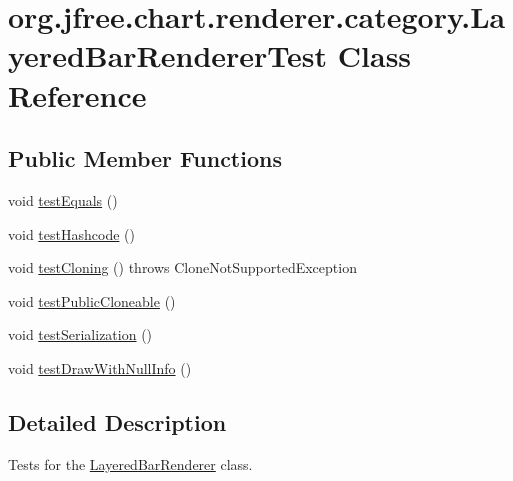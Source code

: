 \hypertarget{classorg_1_1jfree_1_1chart_1_1renderer_1_1category_1_1_layered_bar_renderer_test}{}\section{org.\+jfree.\+chart.\+renderer.\+category.\+Layered\+Bar\+Renderer\+Test Class Reference}
\label{classorg_1_1jfree_1_1chart_1_1renderer_1_1category_1_1_layered_bar_renderer_test}
\subsection*{Public Member Functions}
\begin{DoxyCompactItemize}
\item 
void \mbox{\hyperlink{classorg_1_1jfree_1_1chart_1_1renderer_1_1category_1_1_layered_bar_renderer_test_aeeece3b7e5a6a7843b88d3841bb58679}{test\+Equals}} ()
\item 
void \mbox{\hyperlink{classorg_1_1jfree_1_1chart_1_1renderer_1_1category_1_1_layered_bar_renderer_test_a5b1beeb9cdc090d8e244b494d24d7ad1}{test\+Hashcode}} ()
\item 
void \mbox{\hyperlink{classorg_1_1jfree_1_1chart_1_1renderer_1_1category_1_1_layered_bar_renderer_test_a2496a305e93aa650f5bb59eed054800f}{test\+Cloning}} ()  throws Clone\+Not\+Supported\+Exception 
\item 
void \mbox{\hyperlink{classorg_1_1jfree_1_1chart_1_1renderer_1_1category_1_1_layered_bar_renderer_test_a214b531ab471cc20aec9d909e69bb94a}{test\+Public\+Cloneable}} ()
\item 
void \mbox{\hyperlink{classorg_1_1jfree_1_1chart_1_1renderer_1_1category_1_1_layered_bar_renderer_test_a3d6234d17e75f36be8f12fbf4ea0ba52}{test\+Serialization}} ()
\item 
void \mbox{\hyperlink{classorg_1_1jfree_1_1chart_1_1renderer_1_1category_1_1_layered_bar_renderer_test_ac4f2caecbb4dec2bd232f6640fc9b8be}{test\+Draw\+With\+Null\+Info}} ()
\end{DoxyCompactItemize}


\subsection{Detailed Description}
Tests for the \mbox{\hyperlink{classorg_1_1jfree_1_1chart_1_1renderer_1_1category_1_1_layered_bar_renderer}{Layered\+Bar\+Renderer}} class. 

